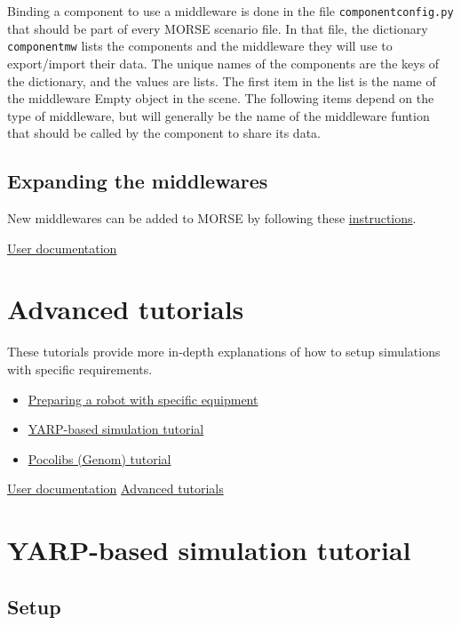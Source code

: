 \documentclass[twoside,a4paper,10pt]{report}
\newcommand{\dokutitlelevelone}[1]{\chapter{#1}}
\newcommand{\dokutitleleveltwo}[1]{\section{#1}}
\newcommand{\dokumonospace}[1]{\texttt{#1}}
\newcommand{\dokuitem}{\item}
\newcommand{\dokuquoting}{\textbar}
\begin{document}
Binding a component to use a middleware is done in the file \dokumonospace{component{\textunderscore}config.py} that should be part of every MORSE scenario file. In that file, the dictionary \dokumonospace{component{\textunderscore}mw} lists the components and the middleware they will use to export/import their data. The unique names of the components are the keys of the dictionary, and the values are lists. The first item in the list is the name of the middleware Empty object in the scene. The following items depend on the type of middleware, but will generally be the name of the middleware funtion that should be called by the component to share its data.


\dokutitleleveltwo{Expanding the middlewares}
\label{b3a6313d335453f4c7ad970485acc1a1}%

New middlewares can be added to MORSE by following these \hyperref[6a8f80abb2f3d2288ad863e67f2499a4]{ instructions}.

{\dokuquoting}{\dokuquoting} \hyperref[a80da1282f2c775bbc5f2c92c836968b]{ User documentation}


\dokutitlelevelone{Advanced tutorials}
\label{1db3103f04a8f50e1168ef3c23748f71}%
\label{1db3103f04a8f50e1168ef3c23748f71}%

These tutorials provide more in-depth explanations of how to setup simulations with specific requirements.



\begin{itemize}
\dokuitem  \hyperref[feb94730bf2c8bc6803a472bb56691ae]{ Preparing a robot with specific equipment}
\dokuitem  \hyperref[1dd029a60f7f3dd1deaf993ce4538edf]{ YARP-based simulation tutorial}
\dokuitem  \hyperref[5c7d3aeca93d2be4626b023df992dc1d]{ Pocolibs (Genom) tutorial}
\end{itemize}
{\dokuquoting}{\dokuquoting} \hyperref[a80da1282f2c775bbc5f2c92c836968b]{ User documentation}  \hyperref[1db3103f04a8f50e1168ef3c23748f71]{ Advanced tutorials}


\dokutitlelevelone{YARP-based simulation tutorial}
\label{46a8ae159056a35cad5aad3f96f08029}%
\label{1dd029a60f7f3dd1deaf993ce4538edf}%

\dokutitleleveltwo{Setup}
\label{a0f848942ce863cf53c0fa6cc684007d}%
\end{document}
